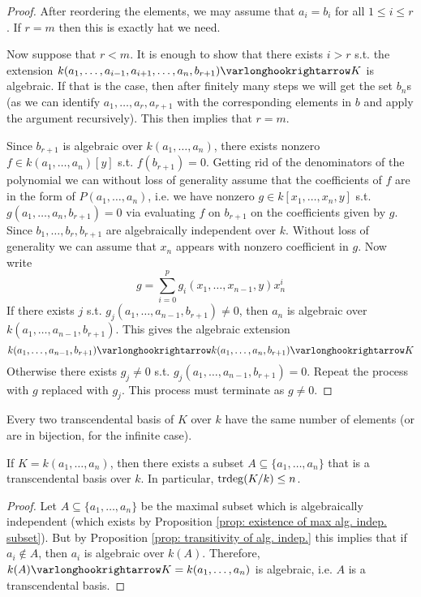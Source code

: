 \begin{proof}
    After reordering the elements, we may assume that $a_i = b_i$ for all $1 \leq i \leq r$. If $r = m$ then this is exactly hat we need.

    Now suppose that $r < m$. It is enough to show that there exists $i > r$ s.t. the extension $k(a_1, \dots, a_{i-1}, a_{i+1}, \dots, a_n, b_{r+1}) \ext K$ is algebraic. If that is the case, then after finitely many steps we will get the set $b_n$s (as we can identify $a_1, \dots, a_r, a_{r+1}$ with the corresponding elements in $b$ and apply the argument recursively). This then implies that $r = m$.

    Since $b_{r+1}$ is algebraic over $k(a_1, \dots, a_n)$, there exists nonzero $f \in k(a_1, \dots, a_n)[y]$ s.t. $f(b_{r+1}) = 0$. Getting rid of the denominators of the polynomial we can without loss of generality assume that the coefficients of $f$ are in the form of $P(a_1, \dots, a_n)$, i.e. we have nonzero $g \in k[x_1, \dots, x_n, y]$ s.t. $g(a_1, \dots, a_n, b_{r+1}) = 0$ via evaluating $f$ on $b_{r+1}$ on the coefficients given by $g$. Since $b_1, \dots, b_{r}, b_{r+1}$ are algebraically independent over $k$. Without loss of generality we can assume that $x_n$ appears with nonzero coefficient in $g$. Now write
    \[
        g = \sum_{i = 0}^p g_i(x_1, \dots, x_{n-1}, y) x_n^i
    \]
    If there exists $j$ s.t. $g_j(a_1, \dots, a_{n-1}, b_{r+1}) \neq 0$, then $a_n$ is algebraic over $k(a_1, \dots, a_{n-1}, b_{r+1})$. This gives the algebraic extension
    \[
        k(a_1, \dots, a_{n-1}, b_{r+1}) \ext k(a_1, \dots, a_n, b_{r+1}) \ext K
    \]
    Otherwise there exists $g_j \neq 0$ s.t. $g_j(a_1, \dots, a_{n-1}, b_{r+1}) = 0$. Repeat the process with $g$ replaced with $g_j$. This process must terminate as $g \neq 0$.
\end{proof}

\begin{corollary}
    Every two transcendental basis of $K$ over $k$ have the same number of elements (or are in bijection, for the infinite case).
\end{corollary}

\begin{proposition}
    If $K = k(a_1, \dots, a_n)$, then there exists a subset $A \subseteq \{a_1, \dots, a_n\}$ that is a transcendental basis over $k$. In particular, $\operatorname{trdeg}(K/k) \leq n$.
\end{proposition}

\begin{proof}
    Let $A \subseteq \{a_1, \dots, a_n\}$ be the maximal subset which is algebraically independent (which exists by Proposition \ref{prop: existence of max alg. indep. subset}). But by Proposition \ref{prop: transitivity of alg. indep.} this implies that if $a_i \notin A$, then $a_i$ is algebraic over $k(A)$. Therefore, $k(A) \ext K = k(a_1, \dots, a_n)$ is algebraic, i.e. $A$ is a transcendental basis. 
\end{proof}

